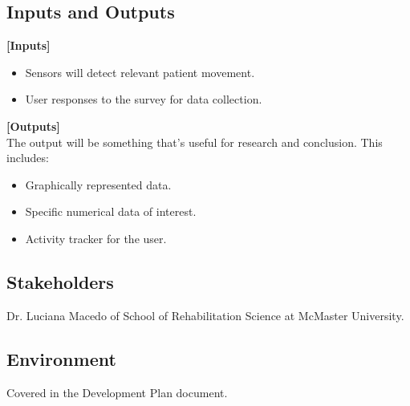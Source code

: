 \documentclass[12pt]{article}
\begin{document}
\pagebreak

\subsection{Inputs and Outputs}

\textbf{[Inputs]}
\begin{itemize}
    \item Sensors will detect relevant patient movement.
    \item User responses to the survey for data collection.
\end{itemize}

\textbf{[Outputs]} \\
\linebreak
The output will be something that's useful for research and conclusion. This includes:
\begin{itemize}
    \item Graphically represented data.
    \item Specific numerical data of interest.
    \item Activity tracker for the user.
\end{itemize}

\subsection{Stakeholders}

Dr. Luciana Macedo of School of Rehabilitation Science at McMaster University.

\subsection{Environment}

Covered in the Development Plan document.
\end{document}
